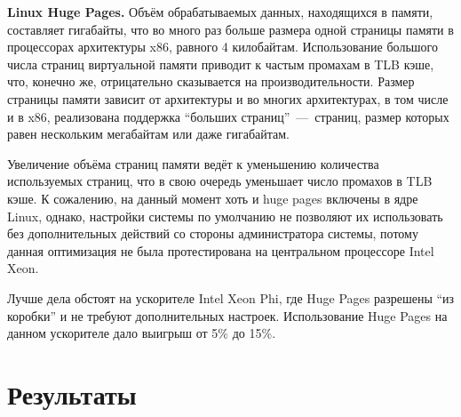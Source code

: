 \documentclass[a4paper,10pt]{extarticle}
\begin{document}
\textbf{Linux Huge Pages.}
Объём обрабатываемых данных, находящихся в памяти, составляет гигабайты, что во много раз больше размера одной страницы памяти в процессорах архитектуры x86, равного 4 килобайтам. Использование большого числа страниц виртуальной памяти приводит к частым промахам в TLB кэше, что, конечно же, отрицательно сказывается на производительности.
Размер страницы памяти зависит от архитектуры и во многих архитектурах, в том числе и в x86, реализована поддержка ``больших страниц''~---~страниц, размер которых равен нескольким мегабайтам или даже гигабайтам.

Увеличение объёма страниц памяти ведёт к уменьшению количества используемых страниц, что в свою очередь уменьшает число промахов в TLB кэше.
К сожалению, на данный момент хоть и huge pages включены в ядре Linux, однако, настройки системы по умолчанию не позволяют их использовать без дополнительных действий со стороны администратора системы, потому данная оптимизация не была протестирована на центральном процессоре Intel Xeon.

Лучше дела обстоят на ускорителе Intel Xeon Phi, где Huge Pages разрешены ``из коробки'' и не требуют дополнительных настроек. Использование Huge Pages на данном ускорителе дало выигрыш от 5\% до 15\%.

\section{Результаты}
\label{sec:results}
\end{document}
